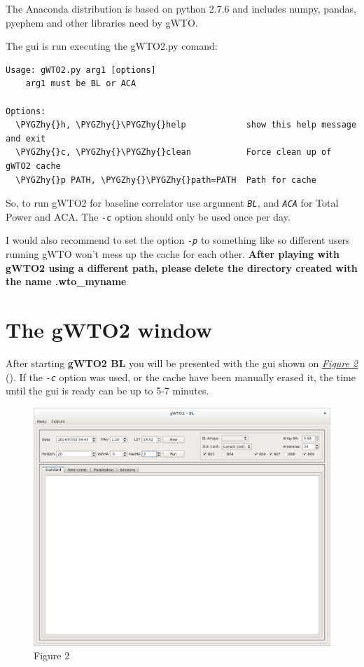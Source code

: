 \documentclass[a4paper,10pt,english]{sphinxmanual}
\def\PYGZhy{\char`\-}
\begin{document}
The Anaconda distribution is based on python 2.7.6 and includes numpy, pandas,
pyephem and other libraries need by gWTO.

The gui is run executing the gWTO2.py comand:

\begin{Verbatim}[commandchars=\\\{\}]
Usage: gWTO2.py arg1 [options]
    arg1 must be BL or ACA

Options:
  \PYGZhy{}h, \PYGZhy{}\PYGZhy{}help            show this help message and exit
  \PYGZhy{}c, \PYGZhy{}\PYGZhy{}clean           Force clean up of gWTO2 cache
  \PYGZhy{}p PATH, \PYGZhy{}\PYGZhy{}path=PATH  Path for cache
\end{Verbatim}

So, to run gWTO2 for baseline correlator use argument \emph{\texttt{BL}}, and
\emph{\texttt{ACA}} for Total Power and ACA. The \emph{\texttt{-c}} option should only be
used once per day.

I would also recommend to set the option \emph{\texttt{-p}} to something like
 so different users running gWTO won't mess up the cache
for each other. \textbf{After playing with gWTO2 using a different path, please}
\textbf{delete the directory created with the name .wto\_myname}


\section{The gWTO2 window}
\label{usingwto:the-gwto2-window}
After starting \textbf{gWTO2 BL} you will be presented with the gui shown on
{\hyperref[usingwto:fig2]{\emph{Figure 2}}} ().
If the \emph{\texttt{-c}} option was used, or the cache have been manually erased it,
the time until the gui is ready can be up to 5-7 minutes.
\begin{figure}[htbp]
\centering
\capstart

\includegraphics{gWTO2__BL_001.png}
\caption{Figure 2}\label{usingwto:fig2}\end{figure}
\end{document}
